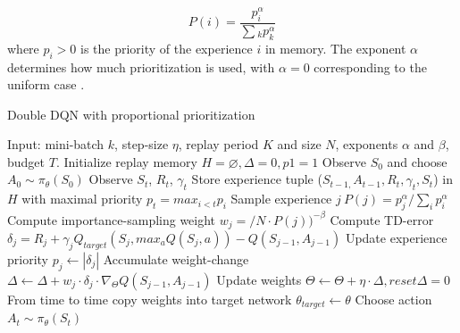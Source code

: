\documentclass[12pt,a4paper]{article}
\begin{document}
\begin{equation}
    P(i) = \frac{p_i^\alpha}{\sum{_k p_k^\alpha}}
\end{equation}
where $p_i > 0$ is the priority of the experience $i$ in memory. The exponent $\alpha$ determines how much prioritization is used, with $\alpha = 0$ corresponding to the uniform case \cite{Schaul2016}.
\begin{algorithm}
    \label{alg:prioritizedReplay}
    \caption{Double DQN with proportional prioritization \cite{Schaul2016}}
    \begin{algorithmic}
    \State Input: mini-batch $k$, step-size $\eta$, replay period $K$ and size $N$, exponents $\alpha$ and $\beta$, budget $T$.
    \State Initialize replay memory $H = \varnothing, \Delta = 0, p1 = 1$
    \State Observe $S_0$ and choose $A_0 \sim \pi_\theta(S_0)$
        \State Observe $S_t$, $R_t$, $\gamma_t$
        \State Store experience tuple ($S_{t-1,} A_{t-1}, R_t, \gamma_t, S_t$) in $H$ with maximal priority $p_t = max_{i<t}p_i$
                \State Sample experience $j ~ P(j) = p^\alpha_j/\sum_i{p^\alpha_i}$
                \State Compute importance-sampling weight $w_j = / N \cdot P(j))^{-\beta}$
                \State Compute TD-error $\delta_j = R_j + \gamma_jQ_{target}(S_j, max_aQ(S_j,a)) - Q(S_{j-1},A_{j-1})$
                \State Update experience priority $p_j \leftarrow |\delta_j|$
                \State Accumulate weight-change $\Delta \leftarrow \Delta + w_j \cdot \delta_j \cdot \nabla_\Theta Q(S_{j-1}, A_{j-1})$
            \EndFor
            \State Update weights $\Theta \leftarrow \Theta + \eta \cdot \Delta, reset \Delta = 0$
            \State From time to time copy weights into target network $\theta_{target} \leftarrow \theta$
        \EndIf
        \State Choose action $A_t \sim \pi_\theta(S_t)$
    \EndFor
    \end{algorithmic}
\end{algorithm}
\end{document}
